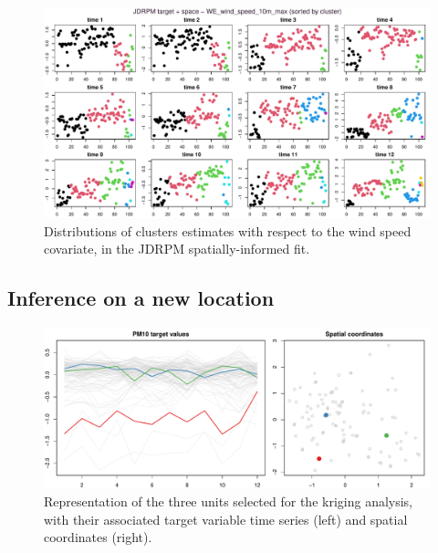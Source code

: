 \documentclass[12pt,	%
	a4paper,		%
	twoside,		%
	openright,		%
	titlepage,%
	]{book}
\theoremstyle{definition}
\begin{document}
\begin{figure}[!ht]
    \centering
    \includegraphics[width=1\linewidth]{Testing/Covariates/in clustering/space J/WE_wind_speed_10m_max_sorted.pdf}
    \caption[Distributions of clusters estimates with respect to the wind speed covariate, JDRPM spatially-informed fit]{Distributions of clusters estimates with respect to the wind speed covariate, in the JDRPM spatially-informed fit.}
    \label{fig: J wind max sorted by cl}
\end{figure}



\subsection{Inference on a new location}
\label{Inference on a new location}

\begin{figure}[!ht]
    \centering
    \includegraphics[width=1\linewidth]{Testing/new kriking/NAed_units.pdf}
    \caption[Selected units for the kriging analysis]{Representation of the three units selected for the kriging analysis, with their associated target variable time series (left) and spatial coordinates (right).}
    \label{fig: NAed units}
\end{figure}
\end{document}
